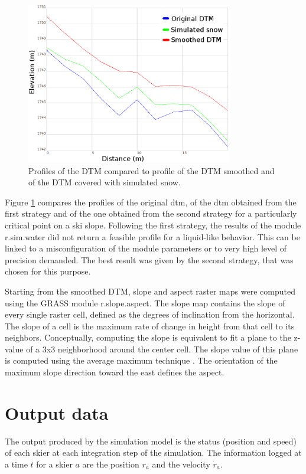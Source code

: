 \documentclass[12pt,a4paper,twoside]{book}
\begin{document}
\begin{figure}[!th]
  \centering
    \includegraphics[width=0.8\textwidth]{images/profiles_dtm.eps}
    \caption{Profiles of the DTM compared to profile of the DTM smoothed and of the DTM covered with simulated snow.}\label{profile_dtm}
\end{figure}

Figure \ref{profile_dtm} compares the profiles of the original dtm, of the dtm obtained from the first strategy and of the one obtained from the second strategy for a particularly critical point on a ski slope. Following the first strategy, the results of the module r.sim.water did not return a feasible profile for a liquid-like behavior. This can be linked to a misconfiguration of the module parameters or to very high level of precision demanded. The best result was given by the second strategy, that was chosen for this purpose.

Starting from the smoothed DTM, slope and aspect raster maps were computed using the GRASS module r.slope.aspect. The slope map contains the slope of every single raster cell, defined as the degrees of inclination from the horizontal. The slope of a cell is the maximum rate of change in height from that cell to its neighbors. Conceptually, computing the slope is equivalent to fit a plane to the z-value of a 3x3 neighborhood around the center cell. The slope value of this plane is computed using the average maximum technique \cite{bur2009}. The orientation of the maximum slope direction toward the east defines the aspect.

\section{Output data}\label{output_data}
The output produced by the simulation model is the status (position and speed) of each skier at each integration step of the simulation. The information logged at a time $t$ for a skier $a$ are the position $r_a$ and the velocity $\dot{r}_a$.
\end{document}
